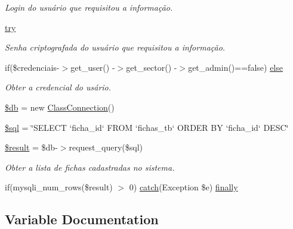 \begin{DoxyCompactItemize}
\begin{DoxyCompactList}\small\item\em Login do usuário que requisitou a informação. \end{DoxyCompactList}\item 
\hyperlink{menu_2configuracoes_2fichas_2index_8php_abe4cc9788f52e49485473dc699537388}{try}
\begin{DoxyCompactList}\small\item\em Senha criptografada do usuário que requisitou a informação. \end{DoxyCompactList}\item 
if(\$credenciais-\/$>$get\+\_\+user() -\/$>$get\+\_\+sector() -\/$>$get\+\_\+admin()==false) \hyperlink{menu_2configuracoes_2fichas_2index_8php_a8f5108ee2efdbfcd6f3d53b8abcb6c09}{else}
\begin{DoxyCompactList}\small\item\em Obter a credencial do usário. \end{DoxyCompactList}\item 
\hyperlink{menu_2configuracoes_2fichas_2index_8php_a1fa3127fc82f96b1436d871ef02be319}{\$db} = new \hyperlink{class_class_connection}{Class\+Connection}()
\item 
\hyperlink{menu_2configuracoes_2fichas_2index_8php_a047170d6020a882807665812a27e2525}{\$sql} = \char`\"{}S\+E\+L\+E\+CT `ficha\+\_\+id` F\+R\+OM `fichas\+\_\+tb` O\+R\+D\+ER BY `ficha\+\_\+id` D\+E\+SC\char`\"{}
\item 
\hyperlink{menu_2configuracoes_2fichas_2index_8php_a112ef069ddc0454086e3d1e6d8d55d07}{\$result} = \$db-\/$>$request\+\_\+query(\$sql)
\begin{DoxyCompactList}\small\item\em Obter a lista de fichas cadastradas no sistema. \end{DoxyCompactList}\item 
if(mysqli\+\_\+num\+\_\+rows(\$result) $>$ 0) \hyperlink{imprimir_2ficha_2index_8php_a8104793004944f01dd070fc8b1ade3c4}{catch}(Exception \$e) \hyperlink{menu_2configuracoes_2fichas_2index_8php_af7cfe1f8cb9dba05c425311a444e3fb4}{finally}
\end{DoxyCompactItemize}


\subsection{Variable Documentation}
\mbox{\label{menu_2configuracoes_2fichas_2index_8php_a26b9f9373f7bb79dfcf8a86dff086b45}} 
